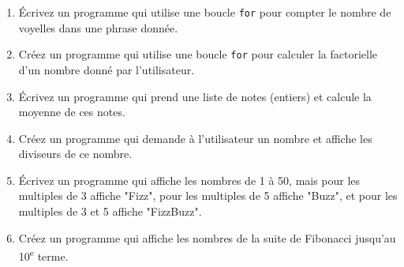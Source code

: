 \begin{enumerate}
    \item Écrivez un programme qui utilise une boucle \lstinline{for} pour compter le nombre de voyelles dans une phrase donnée.

    \item Créez un programme qui utilise une boucle \lstinline{for} pour calculer la factorielle d'un nombre donné par l'utilisateur.

    \item Écrivez un programme qui prend une liste de notes (entiers) et calcule la moyenne de ces notes.

    \item Créez un programme qui demande à l'utilisateur un nombre et affiche les diviseurs de ce nombre.

    \item Écrivez un programme qui affiche les nombres de 1 à 50, mais pour les multiples de 3 affiche "Fizz", pour les multiples de 5 affiche "Buzz", et pour les multiples de 3 et 5 affiche "FizzBuzz".

    \item Créez un programme qui affiche les nombres de la suite de Fibonacci jusqu'au 10\textsuperscript{e} terme.

\end{enumerate}

